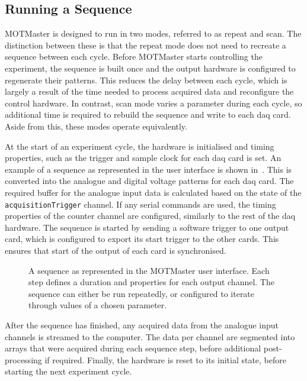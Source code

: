 \subsection{Running a Sequence}
MOTMaster is designed to run in two modes, referred to as repeat and scan.
The distinction between these is that the repeat mode does not need to
recreate a sequence between each cycle. Before MOTMaster starts controlling
the experiment, the sequence is built once and the output hardware is configured
to regenerate their patterns. This reduces the delay between
each cycle, which is largely a result of the time needed to process acquired
data and reconfigure the control hardware. In contrast, scan mode varies a
parameter during each cycle, so additional time is required to rebuild the
sequence and write to each \ac{daq} card. Aside from this, these modes
operate equivalently. \par\noindent
At the start of an experiment cycle, the hardware is
initialised and timing properties, such as the trigger and sample clock for
each \ac{daq} card is set. An example of a sequence as represented in the user interface is shown in~. This is
converted into the analogue and digital voltage patterns for each \ac{daq}
card. The required buffer for the analogue input
data is calculated based on the state of the \verb|acquisitionTrigger|
channel. If any serial commands are used, the timing properties of the
counter channel are configured, similarly to the rest of the \ac{daq}
hardware. The sequence is started by sending a software trigger to one output
card, which is configured to export its start trigger to the other cards.
This ensures that start of the output of each card is synchronised. 
\begin{figure}[!htbp]
    \centering
    \caption[MOTMaster user interface]{A sequence as represented in the MOTMaster user interface. Each step defines a duration and properties for each output channel. The sequence can either be run repeatedly, or configured to iterate through values of a chosen parameter.}
    \label{fig:motmaster_sequence}
\end{figure}
\par\noindent
After the sequence has finished, any acquired data from the analogue input channels is
streamed to the computer. The data per channel are segmented into arrays that
were acquired during each sequence step, before additional post-processing if
required. Finally, the hardware is reset to its initial state, before
starting the next experiment cycle.

